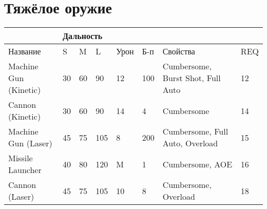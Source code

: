         \section*{Тяжёлое оружие}
        \begin{table}[H]
            \centering
            \begin{tabular}{|l|lll|l|l|l|l|}
            \hline
                                  & \multicolumn{3}{l|}{Дальность}                          &      &     &                                   &     \\ \hline
            Название              & \multicolumn{1}{l|}{S}  & \multicolumn{1}{l|}{M}  & L   & Урон & Б-п & Свойства                          & REQ \\ \hline
            Machine Gun (Kinetic) & \multicolumn{1}{l|}{30} & \multicolumn{1}{l|}{60} & 90  & 12   & 100 & Cumbersome, Burst Shot, Full Auto & 12  \\ \hline
            Cannon (Kinetic)      & \multicolumn{1}{l|}{30} & \multicolumn{1}{l|}{60} & 90  & 14   & 4   & Cumbersome                        & 14  \\ \hline
            Machine Gun (Laser)   & \multicolumn{1}{l|}{45} & \multicolumn{1}{l|}{75} & 105 & 8    & 200 & Cumbersome, Full Auto, Overload   & 15  \\ \hline
            Missile Launcher       & \multicolumn{1}{l|}{40} & \multicolumn{1}{l|}{80} & 120 & M    & 1   & Cumbersome, AOE                   & 16  \\ \hline
            Cannon (Laser)        & \multicolumn{1}{l|}{45} & \multicolumn{1}{l|}{75} & 105 & 10   & 8   & Cumbersome, Overload              & 18  \\ \hline
            \end{tabular}
            \end{table}

